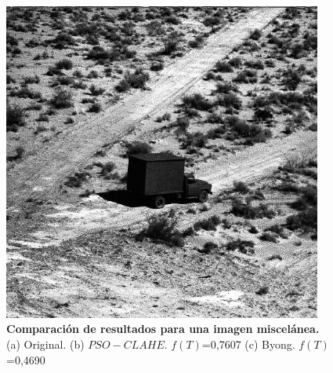 \documentclass[a0,landscape,spanish]{a0poster}
\begin{document}
\begin{multicols}{3}
\begin{figure}[H]
 \includegraphics[width=10.5cm]{Camionclahelicen.jpg}
 \caption{\textbf{Comparación de resultados para una imagen miscelánea.} \\
(a) Original. (b) $PSO-CLAHE$. $f(T)$=0,7607 (c) Byong. $f(T)$=0,4690}
\label{fig:resultado_lenna}
\end{figure}


\end{multicols}
\end{document}
